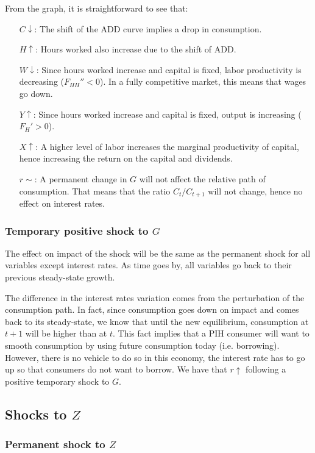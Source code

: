 \documentclass[12pt]{report}
\begin{document}
From the graph, it is straightforward to see that:\begin{itemize}
\item[$C\downarrow$:] The shift of the ADD curve implies a drop in consumption.
\item[$H\uparrow$:] Hours worked also increase due to the shift of ADD.
\item[$W\downarrow$:] Since hours worked increase and capital is fixed, labor productivity is decreasing ($F_{HH}'' < 0$). In a fully competitive market, this means that wages go down.
\item[$Y\uparrow$:] Since hours worked increase and capital is fixed, output is increasing ($F_H' > 0$).
\item[$X\uparrow$:] A higher level of labor increases the marginal productivity of capital, hence increasing the return on the capital and dividends.
\item[$r\sim$:] A permanent change in $G$ will not affect the relative path of consumption. That means that the ratio $C_t/C_{t+1}$ will not change, hence no effect on interest rates.
\end{itemize}

\subsubsection{Temporary positive shock to $G$}

The effect on impact of the shock will be the same as the permanent shock for all variables except interest rates. As time goes by, all variables go back to their previous steady-state growth.

The difference in the interest rates variation comes from the perturbation of the consumption path. In fact, since consumption goes down on impact and comes back to its steady-state, we know that until the new equilibrium, consumption at $t+1$ will be higher than at $t$. This fact implies that a PIH consumer will want to smooth consumption by using future consumption today (i.e. borrowing). However, there is no vehicle to do so in this economy, the interest rate has to go up so that consumers do not want to borrow. We have that $r\uparrow$ following a positive temporary shock to $G$.

\subsection{Shocks to $Z$}

\subsubsection{Permanent shock to $Z$}
\end{document}

